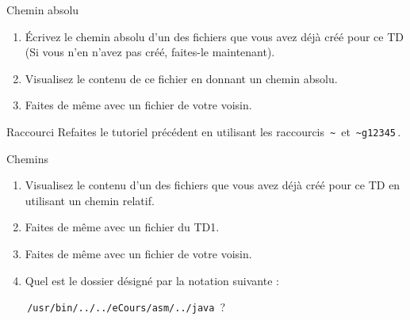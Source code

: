 \documentclass[a4paper,11pt]{article}
\begin{document}
\begin{Tutoriel}{Chemin absolu}%
%
\begin{enumerate}	
	\item \'Ecrivez le chemin absolu d'un des fichiers que vous
	avez d\'ej\`a cr\'e\'e pour ce TD (Si vous n'en n'avez pas cr\'e\'e, 
	faites-le maintenant).  
	\item Visualisez le contenu de ce fichier en donnant un
	chemin absolu.
	\item Faites de m\^eme avec un fichier de votre voisin.
	
\end{enumerate}	
\end{Tutoriel}


\begin{Tutoriel}{Raccourci}
%	
	Refaites le tutoriel pr\'ec\'edent en utilisant les raccourcis 
	\,\verb|~|\, et \,\verb|~g12345|\,.
	
	\par
\end{Tutoriel}
\newpage

\begin{Tutoriel}{Chemins}
%	
	\begin{enumerate}
		
		\item Visualisez le contenu d'un des fichiers que vous avez d\'ej\`a cr\'e\'e pour ce TD en utilisant un chemin relatif.
		\item Faites de m\^eme avec un fichier du TD1. 
		\item Faites de m\^eme avec un fichier de votre voisin. 
		\item 
		Quel est le dossier d\'esign\'e par la notation suivante : \par
		\,\verb|/usr/bin/../../eCours/asm/../java|\, ?
		
	\end{enumerate}
\end{Tutoriel}


\end{document}

